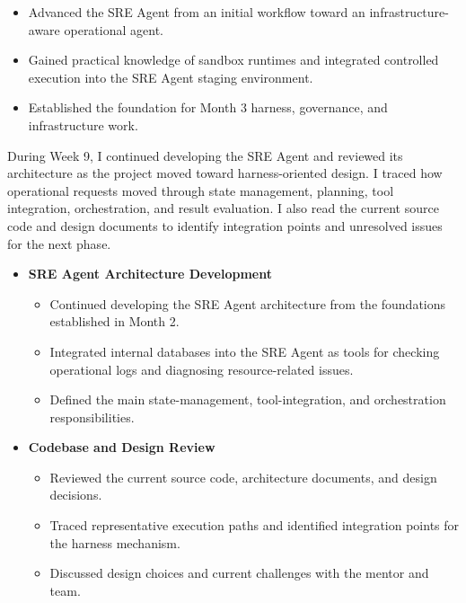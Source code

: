 
\begin{itemize}
    \item Advanced the SRE Agent from an initial workflow toward an infrastructure-aware operational agent.
    \item Gained practical knowledge of sandbox runtimes and integrated controlled execution into the SRE Agent staging environment.
    \item Established the foundation for Month 3 harness, governance, and infrastructure work.
\end{itemize}


During Week 9, I continued developing the SRE Agent and reviewed its architecture as the project moved toward harness-oriented design. I traced how operational requests moved through state management, planning, tool integration, orchestration, and result evaluation. I also read the current source code and design documents to identify integration points and unresolved issues for the next phase.


\begin{itemize}
    \item \textbf{SRE Agent Architecture Development}
    \begin{itemize}
        \item Continued developing the SRE Agent architecture from the foundations established in Month 2.
        \item Integrated internal databases into the SRE Agent as tools for checking operational logs and diagnosing resource-related issues.
        \item Defined the main state-management, tool-integration, and orchestration responsibilities.
    \end{itemize}

    \item \textbf{Codebase and Design Review}
    \begin{itemize}
        \item Reviewed the current source code, architecture documents, and design decisions.
        \item Traced representative execution paths and identified integration points for the harness mechanism.
        \item Discussed design choices and current challenges with the mentor and team.
    \end{itemize}
\end{itemize}

